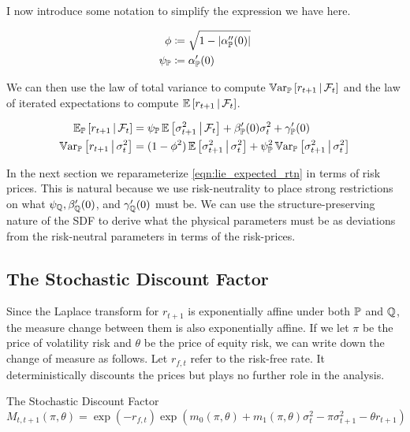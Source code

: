 \documentclass[11pt, letterpaper, twoside, final]{article}
\begin{document}
I now introduce some notation to simplify the expression we have here.

\begin{align}
    \phi &\coloneqq \sqrt{1 - \lvert\alpha_{\mathbb{P}}''(0)\rvert} \\
    \psi_{\mathbb{P}} &\coloneqq \alpha_{\mathbb{P}}'(0)
\end{align}

We can then use the law of total variance to compute $\operatorname{\mathbb{V}ar}_{\mathbb{P}}\left[r_{t+1} \,\middle\vert\, \mathcal{F}_t\right]$ and the law of
iterated expectations to compute $\operatorname{\mathbb{E}}\left[r_{t+1} \,\middle\vert\, \mathcal{F}_t \right]$.

\begin{align}
    \label{eqn:lie_expected_rtn}
    \E_{\PP}\left[r_{t+1} \mvert \F_t\right] &= \psi_{\PP} \E\left[\sigma^2_{t+1} \mvert \F_t\right]  +
    \beta_{\PP}'(0) \sigma^2_t + \gamma_{\PP}'(0)  \\
%
    \label{eqn:ltv_rtn_variance}
    \Var_{\PP}\left[r_{t+1} \mvert \sigma^2_t\right]  &= (1 - \phi^2) \E \left[\sigma^2_{t+1} \mvert \sigma^2_t
    \right] + \psi_{\PP}^2 \Var_{\PP}\left[\sigma^2_{t+1} \mvert \sigma^2_t \right] 
\end{align}

In the next section we reparameterize \cref{eqn:lie_expected_rtn} in terms of risk prices.
This is natural because we use risk-neutrality to place strong restrictions on what $\psi_{\mathbb{Q}}, \beta_{\mathbb{Q}}'(0)$,
and $\gamma_{\mathbb{Q}}'(0)$ must be. 
We can  use the structure-preserving nature of the SDF to derive what the physical parameters must be as deviations
from the risk-neutral parameters in terms of the risk-prices.


\subsection{The Stochastic Discount Factor}\label{sec:deriving_sdf_functions}

Since the Laplace transform for $r_{t+1}$  is exponentially affine under both $\mathbb{P}$ and $\mathbb{Q}$, the measure change
between them is also exponentially affine.
If we let $\pi$ be the price of volatility risk and $\theta$ be the price of equity risk, we can write down the
change of measure as follows.
Let $r_{f,t}$ refer to the risk-free rate.
It deterministically discounts the prices but plays no further role in the analysis.


\begin{defn}{The Stochastic Discount Factor}
    \begin{equation}
        M_{t,t+1}(\pi, \theta) = \exp\left(-r_{f,t}\right) \exp\left(m_{0}(\pi, \theta) + m_1(\pi, \theta)
        \sigma_t^2 - \pi \sigma^2_{t+1} - \theta r_{t+1}\right) 
    \end{equation}
\end{defn}
\end{document}
